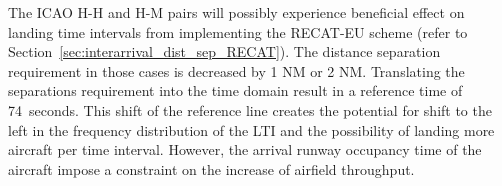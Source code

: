 
The ICAO H-H and H-M pairs will possibly experience beneficial effect on landing time intervals from implementing the RECAT-EU scheme (refer to Section~\ref{sec:interarrival_dist_sep_RECAT}). The distance separation requirement in those cases is decreased by 1 NM or 2 NM. Translating the separations requirement into the time domain result in a reference time of 74~seconds. This shift of the reference line creates the potential for shift to the left in the frequency distribution of the LTI and the possibility of landing more aircraft per time interval. However, the arrival runway occupancy time of the aircraft impose a constraint on the increase of airfield throughput.
 

